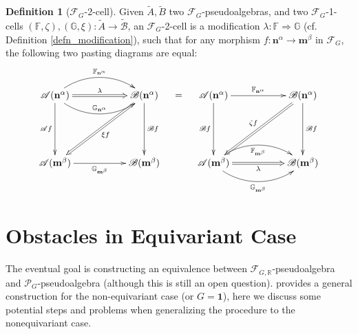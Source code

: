 \documentclass[openany, amssymb, psamsfonts]{amsart}
\theoremstyle{definition}
\newtheorem{defn}{Definition}[section]
\numberwithin{equation}{section}
\newcommand{\F}{\mathscr{F}} %
\newcommand{\cP}{\mathscr{P}} %
\newcommand{\A}{\mathscr{A}}
\newcommand{\B}{\mathscr{B}}
\newcommand{\FF}{\mathbb{F}} %
\newcommand{\RR}{\mathbb{R}} %
\newcommand{\GG}{\mathbb{G}} %
\begin{document}
\vspace{1pt}

\begin{defn}[$\F_G$-2-cell]
    Given $\tilde{A},\tilde{B}$ two $\F_G$-pseudoalgebras, and two $\F_G$-1-cells $(\FF,\zeta),(\GG,\xi):\tilde{A}\rightarrow\tilde{\B}$, an $\F_G$-2-cell is a modification $\lambda:\FF\Rightarrow\GG$ (cf. Definition \ref{defn_modification}), such that for any morphism $f:\mathbf{n}^\alpha\rightarrow\mathbf{m}^\beta$ in $\F_G$, the following two pasting diagrams are equal:
    \begin{align*}
        \xymatrix{
            \A(\mathbf{n}^\alpha) \ar[dd]_-{\A f} \ar@(ur,ul)[rr]^-{\FF_{\mathbf{n}^\alpha}} \ar@{=>}[rr]^-{\lambda} \ar@(dr,dl)[rr]^-{\GG_{\mathbf{n}^\alpha}} && \B(\mathbf{n}^\alpha) \ar[dd]^-{\B f} \ar@{=>}[ddll]^-{\xi f}\\
            \\
            \A(\mathbf{m}^\beta) \ar[rr]_-{\GG_{\mathbf{m}^\beta}} && \B(\mathbf{m}^\beta)
        }\quad = \quad \xymatrix{
            \A(\mathbf{n}^\alpha) \ar[dd]_-{\B f} \ar[rr]^-{\FF_{\mathbf{n}^\alpha}} && \B(\mathbf{n}^\alpha) \ar[dd]^-{\B f} \ar@{=>}[ddll]_-{\zeta f}\\
            \\
            \A(\mathbf{m}^\beta) \ar@(ur,ul)[rr]_-{\FF_{\mathbf{m}^\beta}} \ar@{=>}[rr]_-{\lambda} \ar@(dr,dl)[rr]_-{\GG_{\mathbf{m}^\beta}} && \B(\mathbf{m}^\beta)
        }
    \end{align*}
\end{defn}

\section{Obstacles in Equivariant Case}\label{sec_results}
The eventual goal is constructing an equivalence between $\F_{G,\RR}$-pseudoalgebra and $\cP_G$-pseudoalgebra (although this is still an open question). \cite{LMRZ26} provides a general construction for the non-equivariant case (or $G=\mathbf{1}$), here we discuss some potential steps and problems when generalizing the procedure to the nonequivariant case.
\end{document}
